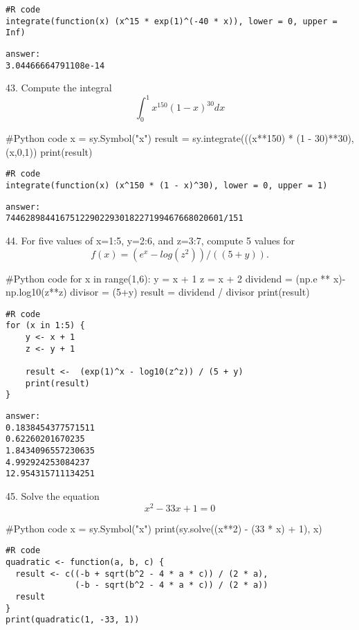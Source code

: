\documentclass{article}
\begin{document}
\begin{verbatim}
#R code
integrate(function(x) (x^15 * exp(1)^(-40 * x)), lower = 0, upper = Inf)
\end{verbatim}

\begin{verbatim}
answer: 
3.04466664791108e-14
\end{verbatim}


43. Compute the integral \[ \int_0^1 x^{150}(1-x)^{30}dx\]
\begin{pythoncode}
#Python code
x = sy.Symbol("x")
result = sy.integrate(((x**150) * (1 - 30)**30), (x,0,1))
print(result)
\end{pythoncode}

\begin{verbatim}
#R code
integrate(function(x) (x^150 * (1 - x)^30), lower = 0, upper = 1)
\end{verbatim}

\begin{verbatim}
answer: 
74462898441675122902293018227199467668020601/151
\end{verbatim}


44. For five values of x=1:5, y=2:6, and z=3:7, compute 5 values for \[f(x)=(e^x-log⁡(z^2))/((5+y)).\]
\begin{pythoncode}
#Python code
for x in range(1,6):
    y = x + 1
    z = x + 2
    dividend = (np.e ** x)-np.log10(z**z)
    divisor = (5+y)
    result = dividend / divisor
    print(result)
\end{pythoncode}

\begin{verbatim}
#R code
for (x in 1:5) {
    y <- x + 1
    z <- y + 1

    result <-  (exp(1)^x - log10(z^z)) / (5 + y)
    print(result)
}
\end{verbatim}

\begin{verbatim}
answer: 
0.1838454377571511
0.62260201670235
1.8434096557230635
4.992924253084237
12.954315711134251
\end{verbatim}

45. Solve the equation \[x^2-33x+1=0\]
\begin{pythoncode}
#Python code
x = sy.Symbol("x")
print(sy.solve((x**2) - (33 * x) + 1), x)
\end{pythoncode}

\begin{verbatim}
#R code
quadratic <- function(a, b, c) {
  result <- c((-b + sqrt(b^2 - 4 * a * c)) / (2 * a),
              (-b - sqrt(b^2 - 4 * a * c)) / (2 * a))
  result
}
print(quadratic(1, -33, 1))
\end{verbatim}
\end{document}
